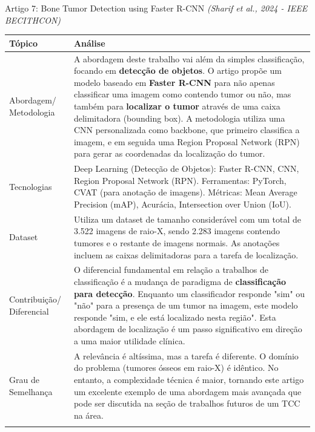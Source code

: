 \documentclass[12pt, a4paper]{article}
\begin{document}
\begin{fichabox}{Artigo 7: Bone Tumor Detection using Faster R-CNN}
\textit{(Sharif et al., 2024 - IEEE BECITHCON)}

\begin{longtable}{@{} B L{10.5cm} @{}}
    \toprule
    \textbf{Tópico} & \textbf{Análise} \\
    \midrule
    \endhead 
    
    Abordagem/ Metodologia & A abordagem deste trabalho vai além da simples classificação, focando em \textbf{detecção de objetos}. O artigo propõe um modelo baseado em \textbf{Faster R-CNN} para não apenas classificar uma imagem como contendo tumor ou não, mas também para \textbf{localizar o tumor} através de uma caixa delimitadora (bounding box). A metodologia utiliza uma CNN personalizada como backbone, que primeiro classifica a imagem, e em seguida uma Region Proposal Network (RPN) para gerar as coordenadas da localização do tumor. \\
    \addlinespace
    
    Tecnologias & Deep Learning (Detecção de Objetos): Faster R-CNN, CNN, Region Proposal Network (RPN). Ferramentas: PyTorch, CVAT (para anotação de imagens). Métricas: Mean Average Precision (mAP), Acurácia, Intersection over Union (IoU). \\
    \addlinespace
    
    Dataset & Utiliza um dataset de tamanho considerável com um total de 3.522 imagens de raio-X, sendo 2.283 imagens contendo tumores e o restante de imagens normais. As anotações incluem as caixas delimitadoras para a tarefa de localização. \\
    \addlinespace
    
    Contribuição/ Diferencial & O diferencial fundamental em relação a trabalhos de classificação é a mudança de paradigma de \textbf{classificação para detecção}. Enquanto um classificador responde "sim" ou "não" para a presença de um tumor na imagem, este modelo responde "sim, e ele está localizado nesta região". Esta abordagem de localização é um passo significativo em direção a uma maior utilidade clínica. \\
    \addlinespace
    
    Grau de Semelhança & A relevância é altíssima, mas a tarefa é diferente. O domínio do problema (tumores ósseos em raio-X) é idêntico. No entanto, a complexidade técnica é maior, tornando este artigo um excelente exemplo de uma abordagem mais avançada que pode ser discutida na seção de trabalhos futuros de um TCC na área. \\
    \addlinespace
    

\end{longtable}
\end{fichabox}
\end{document}
